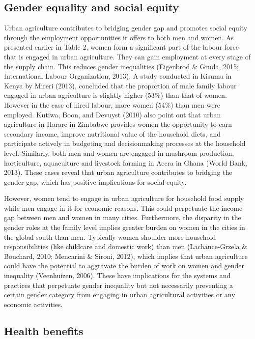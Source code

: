\subsection{Gender equality and social equity}

Urban agriculture contributes to bridging gender gap and promotes social equity through the employment opportunities it offers to both men and women. As presented earlier in Table 2, women form a significant part of the labour force that is engaged in urban agriculture. They can gain employment at every stage of the supply chain. This reduces gender inequalities (Eigenbrod \& Gruda, 2015; International Labour Organization, 2013). A study conducted in Kisumu in Kenya by Mireri (2013), concluded that the proportion of male family labour engaged in urban agriculture is slightly higher (53\%) than that of women. However in the case of hired labour, more women (54\%) than men were employed. Kutiwa, Boon, and Devuyst (2010) also point out that urban agriculture in Harare in Zimbabwe provides women the opportunity to earn secondary income, improve nutritional value of the household diets, and participate actively in budgeting and decisionmaking processes at the household level. Similarly, both men and women are engaged in mushroom production, horticulture, aquaculture and livestock farming in Accra in Ghana (World Bank, 2013). These cases reveal that urban agriculture contributes to bridging the gender gap, which has positive implications for social equity.

However, women tend to engage in urban agriculture for household food supply while men engage in it for economic reasons. This could perpetuate the income gap between men and women in many cities. Furthermore, the disparity in the gender roles at the family level implies greater burden on women in the cities in the global south than men. Typically women shoulder more household responsibilities (like childcare and domestic work) than men (Lachance-Grzela \& Bouchard, 2010; Mencarini \& Sironi, 2012), which implies that urban agriculture could have the potential to aggravate the burden of work on women and gender inequality (Veenhuizen, 2006). These have implications for the systems and practices that perpetuate gender inequality but not necessarily preventing a certain gender category from engaging in urban agricultural activities or any economic activities.

\subsection{Health benefits}

